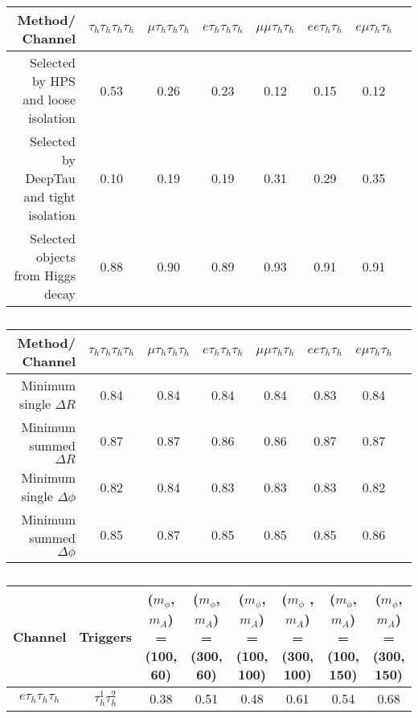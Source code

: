 \begin{table}[h]
    \centering
    \begin{tabular}{|r|c|c|c|c|c|c|c|}
         \hline
         Method/ Channel & $\tau_{h}\tau_{h}\tau_{h}\tau_{h}$ & $\mu\tau_{h}\tau_{h}\tau_{h}$ & $e\tau_{h}\tau_{h}\tau_{h}$ & $\mu\mu\tau_{h}\tau_{h}$ & $ee\tau_{h}\tau_{h}$ & $e\mu\tau_{h}\tau_{h}$ \\
         \hline
         \hline
         Selected by HPS and loose isolation & 0.53 & 0.26 & 0.23 & 0.12 & 0.15 & 0.12 \\
         Selected by DeepTau and tight isolation & 0.10 & 0.19 & 0.19 & 0.31 & 0.29 & 0.35 \\
         Selected objects from Higgs decay & 0.88 & 0.90 & 0.89 & 0.93 & 0.91 & 0.91 \\
         \hline
    \end{tabular}
    \caption{}
\end{table}


\begin{table}[h]
    \centering
    \begin{tabular}{|r|c|c|c|c|c|c|c|}
         \hline
         Method/ Channel & $\tau_{h}\tau_{h}\tau_{h}\tau_{h}$ & $\mu\tau_{h}\tau_{h}\tau_{h}$ & $e\tau_{h}\tau_{h}\tau_{h}$ & $\mu\mu\tau_{h}\tau_{h}$ & $ee\tau_{h}\tau_{h}$ & $e\mu\tau_{h}\tau_{h}$ \\
         \hline
         \hline
         Minimum single $\Delta R$ & 0.84 & 0.84 & 0.84 & 0.84 & 0.83 & 0.84 \\
         Minimum summed $\Delta R$ & 0.87 & 0.87 & 0.86 & 0.86 & 0.87 & 0.87 \\
         Minimum single $\Delta\phi$ & 0.82 & 0.84 & 0.83 & 0.83 & 0.83 & 0.82 \\
         Minimum summed $\Delta\phi$ & 0.85 & 0.87 & 0.85 & 0.85 & 0.85 & 0.86 \\
         \hline
    \end{tabular}
    \caption{}
\end{table}

\begin{table}[h]
    \centering
    \begin{tabular}{|c|c||c|c|c|c|c|c|}
         \hline
         Channel & Triggers & ($m_{\phi}$, $m_{A}$) = (100, 60) &  ($m_{\phi}$, $m_{A}$) = (300, 60) & ($m_{\phi}$, $m_{A}$) = (100, 100) & ($m_{\phi}$ , $m_{A}$) = (300, 100) & ($m_{\phi}$, $m_{A}$) = (100, 150) & ($m_{\phi}$, $m_{A}$) = (300, 150) \\
         \hline
         \hline
         $e \tau_h \tau_h \tau_h$ & $\tau_{h}^{1}\tau_{h}^2$ & 0.38 & 0.51 & 0.48 & 0.61 & 0.54 & 0.68 \\
    \end{tabular}
    \caption{}
\end{table}

